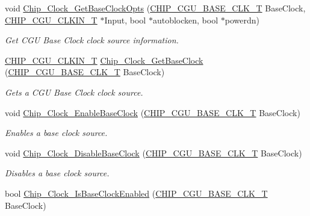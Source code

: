 \begin{DoxyCompactItemize}
void \hyperlink{group___c_l_o_c_k__18_x_x__43_x_x_ga9d6621765b2b77f40db1eed937cb5dc8}{Chip\+\_\+\+Clock\+\_\+\+Get\+Base\+Clock\+Opts} (\hyperlink{chip__clocks_8h_a31e266dd83cc66eb866d8d051ffd1d45}{C\+H\+I\+P\+\_\+\+C\+G\+U\+\_\+\+B\+A\+S\+E\+\_\+\+C\+L\+K\+\_\+T} Base\+Clock, \hyperlink{group___c_l_o_c_k__18_x_x__43_x_x_ga0975326707efebf2b074283e6c602f18}{C\+H\+I\+P\+\_\+\+C\+G\+U\+\_\+\+C\+L\+K\+I\+N\+\_\+T} $\ast$Input, bool $\ast$autoblocken, bool $\ast$powerdn)
\begin{DoxyCompactList}\small\item\em Get C\+GU Base Clock clock source information. \end{DoxyCompactList}\item 
\hyperlink{group___c_l_o_c_k__18_x_x__43_x_x_ga0975326707efebf2b074283e6c602f18}{C\+H\+I\+P\+\_\+\+C\+G\+U\+\_\+\+C\+L\+K\+I\+N\+\_\+T} \hyperlink{group___c_l_o_c_k__18_x_x__43_x_x_ga76a6aba92d67ee2cacf4d53c9f8043ae}{Chip\+\_\+\+Clock\+\_\+\+Get\+Base\+Clock} (\hyperlink{chip__clocks_8h_a31e266dd83cc66eb866d8d051ffd1d45}{C\+H\+I\+P\+\_\+\+C\+G\+U\+\_\+\+B\+A\+S\+E\+\_\+\+C\+L\+K\+\_\+T} Base\+Clock)
\begin{DoxyCompactList}\small\item\em Gets a C\+GU Base Clock clock source. \end{DoxyCompactList}\item 
void \hyperlink{group___c_l_o_c_k__18_x_x__43_x_x_gae957c1a6743ad69320c1c198e5411ec0}{Chip\+\_\+\+Clock\+\_\+\+Enable\+Base\+Clock} (\hyperlink{chip__clocks_8h_a31e266dd83cc66eb866d8d051ffd1d45}{C\+H\+I\+P\+\_\+\+C\+G\+U\+\_\+\+B\+A\+S\+E\+\_\+\+C\+L\+K\+\_\+T} Base\+Clock)
\begin{DoxyCompactList}\small\item\em Enables a base clock source. \end{DoxyCompactList}\item 
void \hyperlink{group___c_l_o_c_k__18_x_x__43_x_x_gaca76aa951b9e6a69a9ef4fb2aea2aaac}{Chip\+\_\+\+Clock\+\_\+\+Disable\+Base\+Clock} (\hyperlink{chip__clocks_8h_a31e266dd83cc66eb866d8d051ffd1d45}{C\+H\+I\+P\+\_\+\+C\+G\+U\+\_\+\+B\+A\+S\+E\+\_\+\+C\+L\+K\+\_\+T} Base\+Clock)
\begin{DoxyCompactList}\small\item\em Disables a base clock source. \end{DoxyCompactList}\item 
bool \hyperlink{group___c_l_o_c_k__18_x_x__43_x_x_ga265d89b2296192ba7d5d2a63c4edd66e}{Chip\+\_\+\+Clock\+\_\+\+Is\+Base\+Clock\+Enabled} (\hyperlink{chip__clocks_8h_a31e266dd83cc66eb866d8d051ffd1d45}{C\+H\+I\+P\+\_\+\+C\+G\+U\+\_\+\+B\+A\+S\+E\+\_\+\+C\+L\+K\+\_\+T} Base\+Clock)

\end{DoxyCompactItemize}
